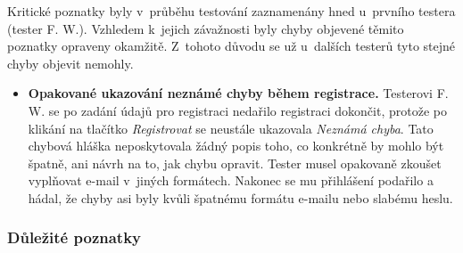 Kritické poznatky byly v~průběhu testování zaznamenány hned u~prvního testera (tester F. W.). Vzhledem k~jejich závažnosti byly chyby objevené těmito poznatky opraveny okamžitě. Z~tohoto důvodu se už u~dalších testerů tyto stejné chyby objevit nemohly.

\begin{itemize}
\item\textbf{Opakované ukazování neznámé chyby během registrace.} Testerovi F. W. se po zadání údajů pro registraci nedařilo registraci dokončit, protože po klikání na tlačítko \emph{Registrovat} se neustále ukazovala \emph{Neznámá chyba}. Tato chybová hláška neposkytovala žádný popis toho, co konkrétně by mohlo být špatně, ani návrh na to, jak chybu opravit. Tester musel opakovaně zkoušet vyplňovat e-mail v~jiných formátech. Nakonec se mu přihlášení podařilo a hádal, že chyby asi byly kvůli špatnému formátu e-mailu nebo slabému heslu.
\end{itemize}

\subsubsection{Důležité poznatky}

